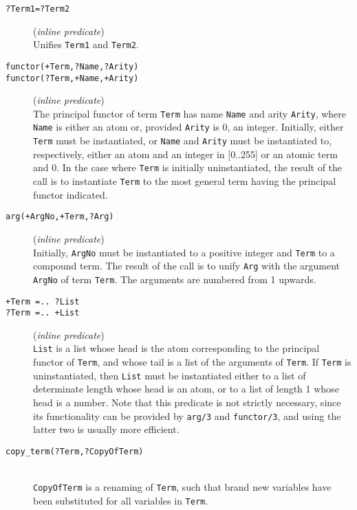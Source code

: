 \begin{description}

\item [{\tt ?Term1=?Term2}] ({\em inline predicate})~\\
	Unifies {\tt Term1} and {\tt Term2}.

\item [{\tt functor(+Term,?Name,?Arity)}]
\item [{\tt functor(?Term,+Name,+Arity)}] ({\em inline predicate})~\\
	The principal functor of term {\tt Term} has name {\tt Name}
	and arity {\tt Arity}, where {\tt Name} is either an atom or,
	provided {\tt Arity} is 0, an integer.  Initially, either {\tt Term}
	must be instantiated, or {\tt Name} and {\tt Arity} must be
	instantiated to, respectively, either an atom and an integer in
	[0..255] or an atomic term and 0.  In the case where {\tt Term} is
	initially uninstantiated, the result of the call is to instantiate
	{\tt Term} to the most general term having the principal functor
	indicated.

\item [{\tt arg(+ArgNo,+Term,?Arg)}] ({\em inline predicate})~\\
	Initially, {\tt ArgNo} must be instantiated to a positive integer and
	{\tt Term} to a compound term.  The result of the call is to unify
	{\tt Arg} with the argument {\tt ArgNo} of term {\tt Term}.  The
	arguments are numbered from 1 upwards.

\item [{\tt +Term =.. ?List}]
\item [{\tt ?Term =.. +List}] ({\em inline predicate})~\\
	{\tt List} is a list whose head is the atom corresponding to
	the principal 
	functor of {\tt Term}, and whose tail is a list of the arguments of
	{\tt Term}.
	If {\tt Term} is uninstantiated, then {\tt List} must be instantiated
	either to a list of determinate length whose head is an atom, or to a
	list of length 1 whose head is a number.  Note that this predicate is
	not strictly necessary, since its functionality can be provided by
	{\tt arg/3} and {\tt functor/3}, and using the latter two is usually
	more efficient.

\item [{\tt copy\_term(?Term,?CopyOfTerm)}]~\\
	{\tt CopyOfTerm} is a renaming of {\tt Term}, such that brand new
	variables have been substituted for all variables in {\tt Term}.


\end{description}
